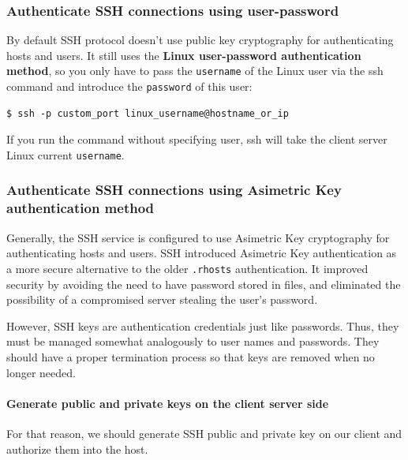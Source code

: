 \documentclass{article}
\newenvironment{blocktemplate}[1]{%
    \tcolorbox[beamer,%
    noparskip,breakable,
    colframe=Blue,%
    colbacklower=LimeGreen!75!LightGreen,%
    title=#1]}%
    {\endtcolorbox}
\newenvironment{codetemplate}[1][]{%
  \mybasecolorbox[#1]
  \itshape
}{%
  \endmybasecolorbox
}
\begin{document}
\subsubsection{Authenticate SSH connections using user-password}

By default SSH protocol doesn't use public key cryptography for authenticating hosts and users. It still uses the \textbf{Linux user-password authentication method}, so you only have to pass the \verb|username| of the Linux user via the ssh command and introduce the \verb|password| of this user:

\begin{codetemplate}{}
\begin{verbatim}
$ ssh -p custom_port linux_username@hostname_or_ip
\end{verbatim}
\end{codetemplate}

\begin{blocktemplate}{Note}
 If you run the command without specifying user, ssh will take the client server Linux current \verb|username|.
\end{blocktemplate}

\subsubsection{Authenticate SSH connections using Asimetric Key authentication method}

Generally, the SSH service is configured to use Asimetric Key cryptography for authenticating hosts and users. SSH introduced Asimetric Key authentication as a more secure alternative to the older \verb|.rhosts| authentication. It improved security by avoiding the need to have password stored in files, and eliminated the possibility of a compromised server stealing the user's password.

However, SSH keys are authentication credentials just like passwords. Thus, they must be managed somewhat analogously to user names and passwords. They should have a proper termination process so that keys are removed when no longer needed.

\paragraph{Generate public and private keys on the client server side}

For that reason, we should generate SSH public and private key on our client and authorize them into the host.
\end{document}
